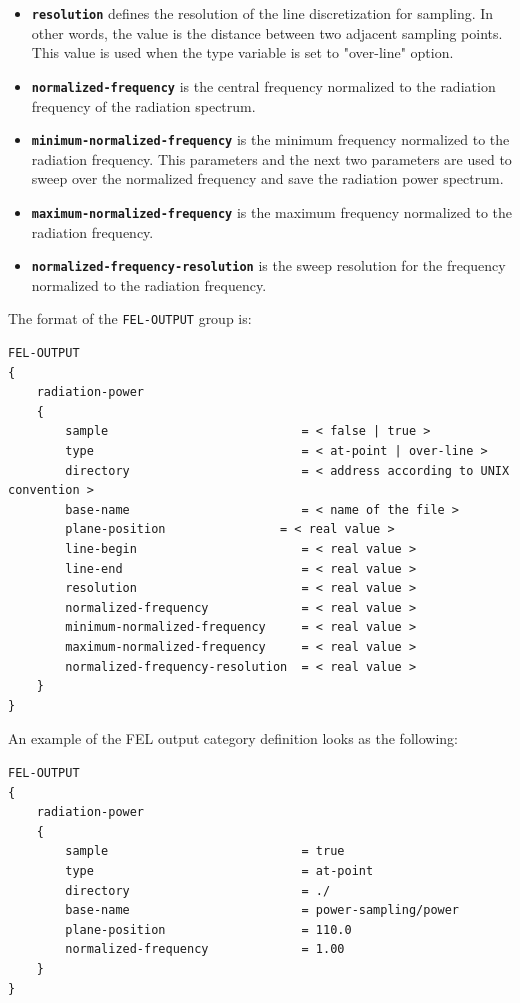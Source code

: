\begin{enumerate}
\begin{itemize}
	\item \textbf{\texttt{resolution}} defines the resolution of the line discretization for sampling. In other words, the value is the distance between two adjacent sampling points. This value is used when the type variable is set to "over-line" option.
	\item \textbf{\texttt{normalized-frequency}} is the central frequency normalized to the radiation frequency of the radiation spectrum.
	\item \textbf{\texttt{minimum-normalized-frequency}} is the minimum frequency normalized to the radiation frequency. This parameters and the next two parameters are used to sweep over the normalized frequency and save the radiation power spectrum.
	\item \textbf{\texttt{maximum-normalized-frequency}} is the maximum frequency normalized to the radiation frequency.
	\item \textbf{\texttt{normalized-frequency-resolution}} is the sweep resolution for the frequency normalized to the radiation frequency.
\end{itemize}
\end{enumerate}

The format of the \texttt{FEL-OUTPUT} group is:
\begin{Verbatim}[frame=single,fontsize=\small,tabsize=4]
FEL-OUTPUT
{
	radiation-power
	{
		sample                           = < false | true >
		type                             = < at-point | over-line >
		directory                        = < address according to UNIX convention >
		base-name                        = < name of the file >
		plane-position 		          = < real value >
		line-begin                       = < real value >
		line-end                         = < real value >
		resolution                       = < real value >
		normalized-frequency             = < real value >
		minimum-normalized-frequency     = < real value >
		maximum-normalized-frequency     = < real value >
		normalized-frequency-resolution  = < real value >
	}
}
\end{Verbatim}
An example of the FEL output category definition looks as the following:
\begin{snugshade}
\begin{Verbatim}[fontsize=\small, tabsize = 4]
FEL-OUTPUT
{
	radiation-power
	{
		sample                           = true
		type                             = at-point
		directory                        = ./
		base-name                        = power-sampling/power
		plane-position                   = 110.0
		normalized-frequency             = 1.00
	}
}
\end{Verbatim}
\end{snugshade} 